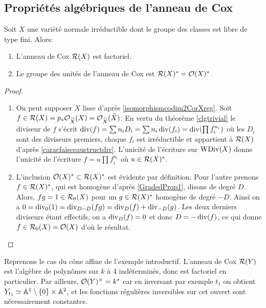 \subsection{Propriétés algébriques de l'anneau de Cox}

\begin{thm}\label{coxFreeFactoriel}
Soit $X$ une variété normale irréductible dont le groupe des classes est libre de type fini. Alors:
\begin{enumerate}
\item L'anneau de Cox $\mathcal{R}(X)$ est factoriel.
\item Le groupe des unités de l'anneau de Cox est $\mathcal{R}(X)^*=\mathcal{O}(X)^*$
\end{enumerate}
\end{thm}
\begin{proof}
\begin{enumerate}
\item On peut supposer $X$ lisse d'après \ref{isomorphismcodim2CorXreg}. Soit $f\in \mathcal{R}(X)=p_*\mathcal{O}_{\widetilde{X}}(X)=\mathcal{O}_{\widetilde{X}}(\widetilde{X})$. En vertu du théorème \ref{clgtrivial} le diviseur de $f$ s'écrit $\operatorname{div}(f)= \sum n_iD_i=\sum n_i\operatorname{div}(f_i)=\operatorname{div}(\prod f_i^{n_i})$ où les $D_i$ sont des diviseurs premiers, chaque $f_i$ est irréductible et appartient à $\mathcal{R}(X)$ d'après \ref{caracfaisceaustructdiv}. L'unicité de l'écriture sur $\operatorname{WDiv}(X)$ donne l'unicité de l'écriture $f=u\prod f_i^{n_i}$ où $u\in \mathcal{R}(X)^*$.
\item L'inclusion $\mathcal{O}(X)^*\subset\mathcal{R}(X)^*$ est évidente par définition. Pour l'autre prenons $f\in\mathcal{R}(X)^*$, qui est homogène d'après \ref{GradedProp1}, disons de degré $D$. Alors, $fg=1\in \mathcal{R}_0(X)$ pour un $g\in\mathcal{R}(X)^*$ homogène de degré $-D$. Ainsi on a $0=\operatorname{div}_0(1)=\operatorname{div}_{D-D}(fg)=\operatorname{div}_D(f)+\operatorname{div}_{-D}(g)$. Les deux derniers diviseurs étant effectifs, on a $\operatorname{div}_D(f)=0$ et donc $D=-\operatorname{div}(f)$, ce qui donne $f\in\mathcal{R}_0(X)=\mathcal{O}(X)$ d'où le résultat.
\end{enumerate}
\end{proof}

\begin{ex}
Reprenons le cas du cône affine de l'exemple introductif.  L'anneau de Cox $\mathcal{R}(Y)$ est l'algèbre de polynômes sur $k$ à $4$ indéterminés, donc est factoriel en particulier.  Par ailleurs, $\mathcal{O}(Y)^{\times}=k^*$ car en inversant par exemple $t_1$  on obtient $Y_{t_1}\simeq \mathbb{A}^{1}\setminus \lbrace0\rbrace\times\mathbb{A}^{2}$, et les fonctions régulières inversibles sur cet ouvert sont nécessairement constantes.
\end{ex}


